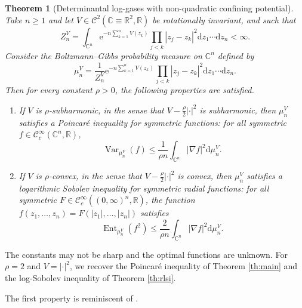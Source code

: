 \documentclass[11pt,reqno]{amsart}
\numberwithin{equation}{section}%
\numberwithin{figure}{section}%
\numberwithin{table}{section}
\theoremstyle{plain}
\newtheorem{theorem}{Theorem}[section]
\theoremstyle{definition}
\begin{document}
\begin{theorem}[Determinantal log-gases with non-quadratic confining potential]
  \label{th:nonquad}
  Take $n\geq1$ and let
  $V\in\mathcal{C}^2(\mathbb{C}\equiv\mathbb{R}^2,\mathbb{R})$ be rotationally
  invariant, and such that
  \begin{equation}
    Z_n^V=\int_{\mathbb{C}^n}\mathrm{e}^{-n\sum_{k=1}^nV(z_k)}\prod_{j<k}|z_j-z_k|^2\mathrm{d}z_1\cdots\mathrm{d}z_n <\infty.
  \end{equation}
  Consider the Boltzmann--Gibbs probability measure on $\mathbb{C}^n$ defined by
  \begin{equation}
    \mu_n^V=\frac{1}{Z_n^V}\mathrm{e}^{-n\sum_{k=1}^nV(z_k)}\prod_{j<k}|z_j-z_k|^2\mathrm{d}z_1\cdots\mathrm{d}z_n.
  \end{equation}
  Then for every constant $\rho>0$, the following properties are satisfied.
  \begin{enumerate}
  \item If $V$ is $\rho$-subharmonic, in the sense that
    $V-\frac{\rho}{2}\left|\cdot\right|^2$ is subharmonic, then $\mu_n^V$
    satisfies a Poincaré inequality for symmetric functions: for all symmetric
    $f\in\mathcal{C}^\infty_c(\mathbb{C}^n,\mathbb{R})$,
    \begin{equation}
      \operatorname{Var}_{\mu_n^V}(f)%
      \leq\frac{1}{\rho n}\int_{\mathbb{C}^n}|\nabla f|^2\mathrm{d}\mu_n^V.
    \end{equation}
  \item If $V$ is $\rho$-convex, in the sense that
    $V-\frac{\rho}{2}\left|\cdot\right|^2$ is convex, then $\mu_n^V$ satisfies
    a logarithmic Sobolev inequality for symmetric radial functions: for all
    symmetric $F\in\mathcal{C}^\infty_c((0,\infty)^n,\mathbb{R})$, the
    function $f(z_1,\ldots,z_n)=F(|z_1|,\ldots,|z_n|)$ satisfies
    \begin{equation}
      \operatorname{Ent}_{\mu_n^V}(f^2)%
      \leq\frac{2}{\rho n}\int_{\mathbb{C}^n}|\nabla f|^2\mathrm{d}\mu_n^V.
    \end{equation}
  \end{enumerate}
\end{theorem}

The constants may not be sharp and the optimal functions are unknown. For
$\rho=2$ and $V=\left|\cdot\right|^2$, we recover the Poincaré inequality of
Theorem \ref{th:main} and the log-Sobolev inequality of Theorem \ref{th:rlsi}.

The first property is reminiscent of \cite{DePhilippisShenfeld}.
\end{document}
